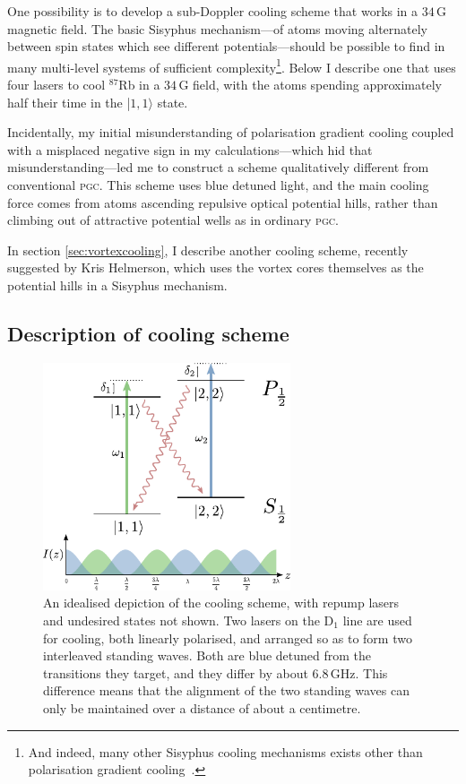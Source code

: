 One possibility is to develop a sub-Doppler cooling scheme that works in a $34\,$G magnetic field. The basic Sisyphus mechanism---of atoms moving alternately between spin states which see different potentials---should be possible to find in many multi-level systems of sufficient complexity\footnote{And indeed, many other Sisyphus cooling mechanisms exists other than polarisation gradient cooling~\cite[p 116]{metcalf_laser_1999}.}. Below I describe one that uses four lasers to cool $^{87}$Rb in a $34\,$G field, with the atoms spending approximately half their time in the \mbox{|$1,1\rangle$} state.

Incidentally, my initial misunderstanding of polarisation gradient cooling coupled with a misplaced negative sign in my calculations---which hid that misunderstanding---led me to construct a scheme qualitatively different from conventional \textsc{pgc}. This scheme uses blue detuned light, and the main cooling force comes from atoms ascending repulsive optical potential hills, rather than climbing out of attractive potential wells as in ordinary \textsc{pgc}.

In section \ref{sec:vortexcooling}, I describe another cooling scheme, recently suggested by Kris Helmerson, which uses the vortex cores themselves as the potential hills in a Sisyphus mechanism.

\subsection{Description of cooling scheme}

\begin{figure}
\begin{center}
\includegraphics[width=0.65\textwidth]{figures/unsorted/cooling_simplified.pdf}
\caption{\label{fig:cooling_simplified}An idealised depiction of the cooling scheme, with repump lasers and undesired states not shown. Two lasers on the D$_1$ line are used for cooling, both linearly polarised, and arranged so as to form two interleaved standing waves. Both are blue detuned from the transitions they target, and they differ by about $6.8\,$GHz. This difference means that the alignment of the two standing waves can only be maintained over a distance of about a centimetre.}
\end{center}
\end{figure}

